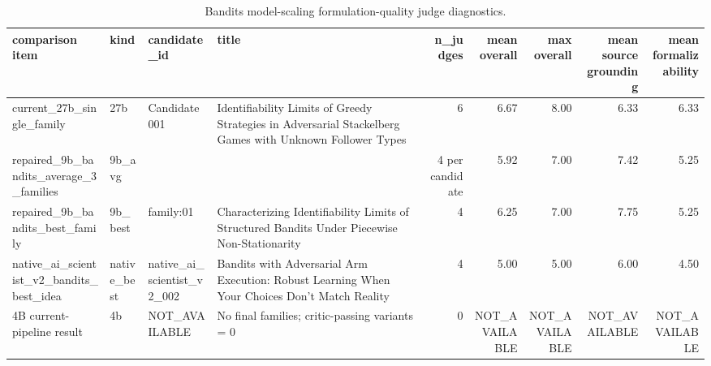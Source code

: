 \begin{table}[htbp]
\centering
\caption{Bandits model-scaling formulation-quality judge diagnostics.}
\label{tab:model\_scaling\_judge}
\begin{tabular}{llllrrrrr}
\toprule
comparison item & kind & candidate\_id & title & n\_judges & mean overall & max overall & mean source grounding & mean formalizability \\
\midrule
current\_27b\_single\_family & 27b & Candidate 001 & Identifiability Limits of Greedy Strategies in Adversarial Stackelberg Games with Unknown Follower Types & 6 & 6.67 & 8.00 & 6.33 & 6.33 \\
repaired\_9b\_bandits\_average\_3\_families & 9b\_avg &  &  & 4 per candidate & 5.92 & 7.00 & 7.42 & 5.25 \\
repaired\_9b\_bandits\_best\_family & 9b\_best & family:01 & Characterizing Identifiability Limits of Structured Bandits Under Piecewise Non-Stationarity & 4 & 6.25 & 7.00 & 7.75 & 5.25 \\
native\_ai\_scientist\_v2\_bandits\_best\_idea & native\_best & native\_ai\_scientist\_v2\_002 & Bandits with Adversarial Arm Execution: Robust Learning When Your Choices Don't Match Reality & 4 & 5.00 & 5.00 & 6.00 & 4.50 \\
4B current-pipeline result & 4b & NOT\_AVAILABLE & No final families; critic-passing variants = 0 & 0 & NOT\_AVAILABLE & NOT\_AVAILABLE & NOT\_AVAILABLE & NOT\_AVAILABLE \\
\bottomrule
\end{tabular}
\end{table}
